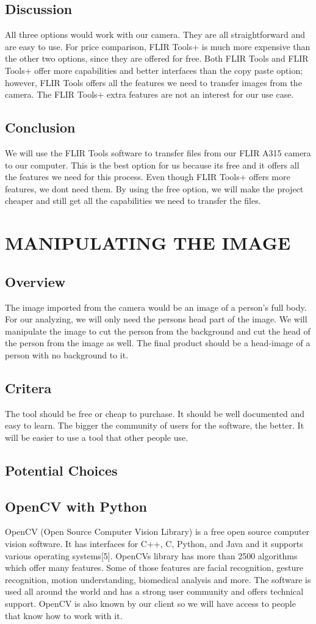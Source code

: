 	\subsection*{Discussion}
		All three options would work with our camera. They are all straightforward and are easy to use. For price comparison,
		FLIR Tools+ is much more expensive than the other two options, since they are offered for free. Both FLIR Tools and
		FLIR Tools+ offer more capabilities and better interfaces than the copy paste option; however, FLIR Tools offers all the
		features we need to transfer images from the camera. The FLIR Tools+ extra features are not an interest for our use case.
	\subsection*{Conclusion}
		We will use the FLIR Tools software to transfer files from our FLIR A315 camera to our computer. This is the best option
		for us because its free and it offers all the features we need for this process. Even though FLIR Tools+ offers more
		features, we dont need them. By using the free option, we will make the project cheaper and still get all the capabilities
		we need to transfer the files.
\section*{MANIPULATING THE IMAGE}
	\subsection*{Overview}
		The image imported from the camera would be an image of a person’s full body. For our analyzing, we will only need
		the persons head part of the image. We will manipulate the image to cut the person from the background and cut the
		head of the person from the image as well. The final product should be a head-image of a person with no background
		to it.
	\subsection*{Critera}
		The tool should be free or cheap to purchase. It should be well documented and easy to learn. The bigger the community
		of users for the software, the better. It will be easier to use a tool that other people use.
	\subsection*{Potential Choices}
	\subsection*{OpenCV with Python}
		OpenCV (Open Source Computer Vision Library) is a free open source computer vision software. It has interfaces for
		C++, C, Python, and Java and it supports various operating systems[5]. OpenCVs library has more than 2500 algorithms
		which offer many features. Some of those features are facial recognition, gesture recognition, motion understanding,
		biomedical analysis and more. The software is used all around the world and has a strong user community and offers
		technical support. OpenCV is also known by our client so we will have access to people that know how to work with
		it. 
